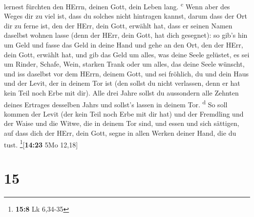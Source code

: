 lernest fürchten den HErrn, deinen Gott, dein Leben lang.
\textsuperscript{c}  Wenn aber des Weges dir zu viel ist,
dass du solches nicht hintragen kannst, darum dass der Ort dir zu ferne
ist, den der HErr, dein Gott, erwählt hat, dass er seinen Namen daselbst
wohnen lasse (denn der HErr, dein Gott, hat dich gesegnet):
 so gib's hin um Geld und fasse das Geld in deine Hand
und gehe an den Ort, den der HErr, dein Gott, erwählt hat,
 und gib das Geld um alles, was deine Seele gelüstet, es
sei um Rinder, Schafe, Wein, starken Trank oder um alles, das deine
Seele wünscht, und iss daselbst vor dem HErrn, deinem Gott, und sei
fröhlich, du und dein Haus  und der Levit, der in deinem
Tor ist (den sollst du nicht verlassen, denn er hat kein Teil noch Erbe
mit dir).  Alle drei Jahre sollst du aussondern alle
Zehnten deines Ertrages desselben Jahrs und sollst's lassen in deinem
Tor. \textsuperscript{d}  So soll kommen der Levit (der
kein Teil noch Erbe mit dir hat) und der Fremdling und der Waise und die
Witwe, die in deinem Tor sind, und essen und sich sättigen, auf dass
dich der HErr, dein Gott, segne in allen Werken deiner Hand, die du
tust. \footnote{\textbf{15:8} Lk 6,34-35}{[}\textbf{14:23} 5Mo 12,18{]}

\hypertarget{section-14}{%
\section{15}\label{section-14}}

